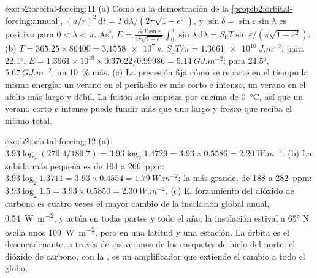 \begin{solution}{exo:b2:orbital-forcing:11}
(a) Como en la demostración de la \cref{prop:b2:orbital-forcing:annual}, $(a/r)^2\,\mathrm dt =
T\,\mathrm d\lambda/(2\pi\sqrt{1 - e^2})$, y $\sin\delta = \sin\varepsilon\sin\lambda$ es positivo
para $0 < \lambda < \pi$. Así, $E = \frac{S_0T\sin\varepsilon}{2\pi\sqrt{1 - e^2}}\int_0^{\pi}\sin\lambda
\,\mathrm d\lambda = S_0T\sin\varepsilon/(\pi\sqrt{1 - e^2})$. (b) $T = 365.25 \times 86400 =
\qty{3.1558e7}{s}$, $S_0T/\pi = \qty{1.3661e10}{J.m^{-2}}$; para \ang{22.1}, $E = 1.3661 \times 10^{10}
\times 0.37622/0.99986 = \qty{5.14}{GJ.m^{-2}}$; para \ang{24.5}, $\qty{5.67}{GJ.m^{-2}}$,
un \qty{10}{\percent} más. (c) La precesión fija cómo se reparte en el tiempo la misma energía: un verano
en el perihelio es más corto e intenso, un verano en el afelio más largo y débil. La fusión solo empieza
por encima de \qty{0}{\celsius}, así que un verano corto e intenso puede fundir más que uno largo y fresco
que reciba el mismo total.
\end{solution}

\begin{solution}{exo:b2:orbital-forcing:12}
(a) $3.93\log_2(279.4/189.7) = 3.93\log_2 1.4729 = 3.93 \times 0.5586 = \qty{2.20}{W.m^{-2}}$. (b) La
subida más pequeña es de 194 a \qty{266}{ppm}: $3.93\log_2 1.3711 = 3.93 \times 0.4554 =
\qty{1.79}{W.m^{-2}}$; la más grande, de 188 a \qty{282}{ppm}: $3.93\log_2 1.5 = 3.93 \times 0.5850 =
\qty{2.30}{W.m^{-2}}$. (c) El forzamiento del dióxido de carbono es cuatro veces el mayor cambio de la
insolación global anual, \qty{0.54}{W.m^{-2}}, y actúa en todas partes y todo el año; la insolación
estival a \ang{65} N oscila unos \qty{109}{W.m^{-2}}, pero en una latitud y una estación. La
órbita es el desencadenante, a través de los veranos de los casquetes de hielo del norte; el dióxido de carbono, con la
, es un amplificador que extiende el cambio a todo el globo.
\end{solution}


